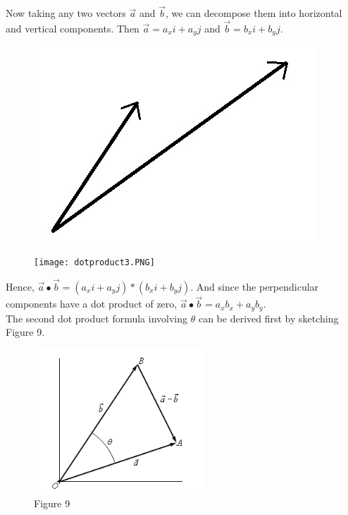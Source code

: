         \noindent Now taking any two vectors $\overrightarrow{a}$ and $\overrightarrow{b}$, we
        can decompose them into horizontal and vertical components. Then
        $\overrightarrow{a}=a_xi+a_yj$ and $\overrightarrow{b}=b_xi+b_yj$.

        \begin{figure}[h]
            \centering
            \begin{minipage}{.5\textwidth}
                \centering
                \includegraphics[scale=0.3]{Resources/Unit3Vectors/dotproduct2.PNG}
            \end{minipage}%
            \begin{minipage}{.5\textwidth}
                \centering
                \texttt{[image: dotproduct3.PNG]}
            \end{minipage}
        \end{figure}

        \noindent Hence, $\overrightarrow{a}\bullet\overrightarrow{b}=(a_xi+a_yj)*(b_xi+b_yj)$.
        And since the perpendicular components have a dot product of zero,
        $\overrightarrow{a}\bullet\overrightarrow{b}=a_xb_x+a_yb_y$.\\

        \noindent The second dot product formula involving $\theta$ can be derived first by
        sketching Figure 9.

        \begin{figure} [h]
            \centering
            \includegraphics[scale=0.75]{Resources/Unit3Vectors/Fig9.PNG}
            \caption*{Figure 9}
        \end{figure}

